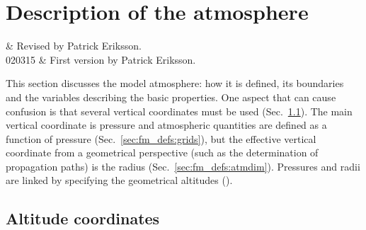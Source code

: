 \chapter{Description of the atmosphere}
 \label{sec:atmosphere}

 & Revised by Patrick Eriksson.\\ 
 020315 & First version by Patrick Eriksson.\\
\stophistory

\graphicspath{{Figs/atmosphere/}}

This section discusses the model atmosphere: how it is defined, its boundaries
and the variables describing the basic properties. One aspect that can cause
confusion is that several vertical coordinates must be used
(Sec.~\ref{sec:fm_defs:altitudes}). The main vertical coordinate is pressure
and atmospheric quantities are defined as a function of pressure
(Sec.~\ref{sec:fm_defs:grids}), but the effective vertical coordinate from a
geometrical perspective (such as the determination of propagation paths) is the
radius (Sec.~\ref{sec:fm_defs:atmdim}). Pressures and radii are linked by
specifying the geometrical altitudes ().


\section{Altitude coordinates}
\label{sec:fm_defs:altitudes}

